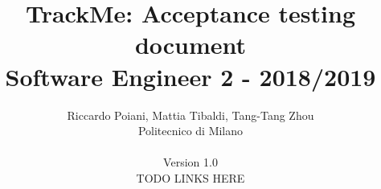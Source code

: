 \documentclass[a4paper]{article}
\begin{document}
\title{TrackMe: Acceptance testing document \\Software Engineer 2 - 2018/2019}
\author{
        Riccardo Poiani, Mattia Tibaldi, Tang-Tang Zhou \\
        Politecnico di Milano\\\\ 
        Version 1.0 \\
        TODO LINKS HERE
}
\maketitle
\newpage
\tableofcontents
\newpage








\end{document}
